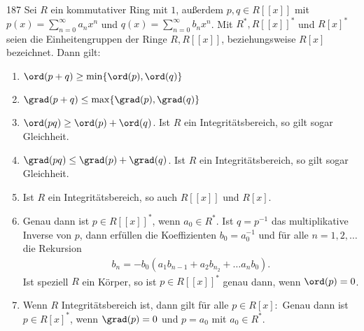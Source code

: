 \begin{algebraUE}{187}
Sei $R$ ein kommutativer Ring mit $1$, außerdem $p,q \in R[[x]]$ mit
$p(x) = \sum_{n=0}^{\infty}a_nx^n$ und $q(x) = \sum_{n=0}^{\infty}b_nx^n$.
Mit $R^*,R[[x]]^*$ und $R[x]^*$ seien die Einheitengruppen der Ringe
$R, R[[x]]$, beziehungsweise $R[x]$ bezeichnet. Dann gilt:
\begin{enumerate}
  \item $\ord(p + q) \geq \min\{\ord(p),\ord(q)\}$
  \item $\grad(p + q) \leq \max\{\grad(p),\grad(q)\}$
  \item $\ord(pq) \geq \ord(p) + \ord(q)$. Ist $R$ ein Integritätsbereich, so gilt
  sogar Gleichheit.
  \item $\grad(pq) \leq \grad(p) + \grad(q)$. Ist $R$ ein Integritätsbereich, so gilt
  sogar Gleichheit.
  \item Ist $R$ ein Integritätsbereich, so auch $R[[x]]$ und $R[x]$.
  \item Genau dann ist $p \in R[[x]]^*$, wenn $a_0 \in R^*$. Ist $q = p^{-1}$
  das multiplikative Inverse von $p$, dann erfüllen die Koeffizienten $b_0 = a_0^{-1}$
  und für alle $n = 1,2,\dots$ die Rekursion
  \begin{align*}
    b_n = -b_0(a_1b_{n-1} + a_2b_{n_2} + \dots a_nb_0).
  \end{align*}
  Ist speziell $R$ ein Körper, so ist $p \in R[[x]]^*$ genau dann, wenn $\ord(p) = 0$.
  \item Wenn $R$ Integritätsbereich ist, dann gilt für alle $p \in R[x]:$ Genau dann
  ist $p \in R[x]^*$, wenn $\grad(p) = 0$ und $p = a_0$ mit $a_0 \in R^*$.
\end{enumerate}
\end{algebraUE}
